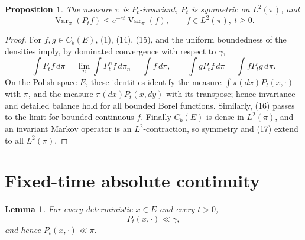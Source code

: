 \documentclass[12pt]{article}
\newtheorem{lemma}{Lemma}
\newtheorem{proposition}{Proposition}
\newcommand{\1}{\mathbf 1}
\newcommand{\Var}{\operatorname{Var}}
\begin{document}
\begin{proposition}\label{prop:gap}
The measure \(\pi\) is \(P_t\)-invariant, \(P_t\) is symmetric on
\(L^2(\pi)\), and
\[
       \Var_\pi(P_t f)\le e^{-ct}\Var_\pi(f),
       \qquad f\in L^2(\pi),\ t\ge0 .                       \tag{17}
\]
\end{proposition}

\begin{proof}
For \(f,g\in C_b(E)\), (1), (14), (15), and the uniform boundedness of the
densities imply, by dominated convergence with respect to \(\gamma\),
\[
 \int P_tf\,d\pi=\lim_n\int P_t^nf\,d\pi_n=\int f\,d\pi,\qquad
 \int gP_tf\,d\pi=\int fP_tg\,d\pi .
\]
On the Polish space \(E\), these identities identify the measure
\(\int\pi(dx)P_t(x,\cdot)\) with \(\pi\), and the measure
\(\pi(dx)P_t(x,dy)\) with its transpose; hence invariance and detailed balance
hold for all bounded Borel functions.  Similarly, (16) passes to the limit for
bounded continuous \(f\).  Finally \(C_b(E)\) is dense in \(L^2(\pi)\), and an
invariant Markov operator is an \(L^2\)-contraction, so symmetry and (17)
extend to all \(L^2(\pi)\).
\end{proof}

\section*{Fixed-time absolute continuity}

\begin{lemma}\label{lem:control}
For every deterministic \(x\in E\) and every \(t>0\),
\[
        P_t(x,\cdot)\ll \gamma ,
\]
and hence \(P_t(x,\cdot)\ll\pi\).
\end{lemma}
\end{document}
